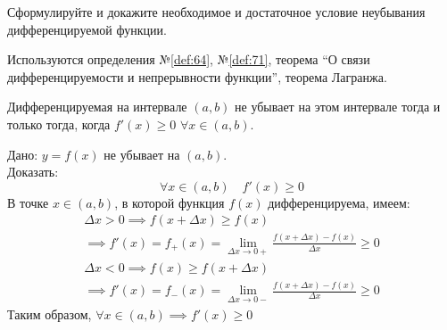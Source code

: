 \begin{question}
    Сформулируйте и докажите необходимое и достаточное условие неубывания дифференцируемой функции.
\end{question}
\begin{used}
    Используются определения №\ref{def:64}, №\ref{def:71}, теорема ``О связи дифференцируемости и непрерывности функции'', теорема Лагранжа.
\end{used}
\begin{theorem}
    Дифференцируемая на интервале $(a, b)$ не убывает на этом интервале тогда и только тогда, когда  $f'(x) \ge 0$ $\forall x \in (a, b)$.
\end{theorem}
\begin{necessity}
    Дано: $y=f(x)$ не убывает на $(a, b)$. \\
    Доказать:  \[ 
        \forall x \in (a, b) \quad f'(x) \ge 0
    \] 
    В точке $x \in (a, b)$, в которой функция $f(x)$ дифференцируема, имеем:
    \begin{gather*}
        \Delta x > 0 \implies f(x + \Delta x) \ge f(x) \\
        \implies f'(x) = f_+(x) = \lim_{\Delta x \to 0+} \frac{f(x + \Delta x) - f(x)}{\Delta x} \ge 0
    \end{gather*} 
    \begin{gather*}
        \Delta x < 0 \implies f(x) \ge f(x + \Delta x) \\
        \implies f'(x) = f_-(x) = \lim_{\Delta x \to 0-} \frac{f(x + \Delta x) - f(x)}{\Delta x} \ge 0
    \end{gather*}
    Таким образом, $\forall x \in (a, b) \implies f'(x) \ge 0$ 
\end{necessity}
